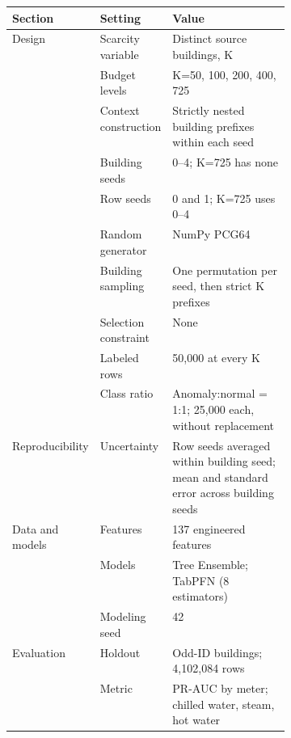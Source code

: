 \documentclass[10pt]{article}
\begin{document}
\begin{preview}\begin{minipage}{\linewidth}
\centering
{}
\label{tab:m5-exp-b-setup}
\begin{tabularx}{\linewidth}{p{0.17\linewidth}p{0.23\linewidth}X}
\toprule
Section & Setting & Value \\
\midrule
Design & Scarcity variable & Distinct source buildings, K \\
 & Budget levels & K=50, 100, 200, 400, 725 \\
 & Context construction & Strictly nested building prefixes within each seed \\
 & Building seeds & 0--4; K=725 has none \\
 & Row seeds & 0 and 1; K=725 uses 0--4 \\
 & Random generator & NumPy PCG64 \\
 & Building sampling & One permutation per seed, then strict K prefixes \\
 & Selection constraint & None \\
 & Labeled rows & 50{,}000 at every K \\
 & Class ratio & Anomaly:normal = 1:1; 25{,}000 each, without replacement \\
\addlinespace[2pt]
Reproducibility & Uncertainty & Row seeds averaged within building seed; mean and standard error across building seeds \\
\addlinespace[2pt]
Data and models & Features & 137 engineered features \\
 & Models & Tree Ensemble; TabPFN (8 estimators) \\
 & Modeling seed & 42 \\
\addlinespace[2pt]
Evaluation & Holdout & Odd-ID buildings; 4{,}102{,}084 rows \\
 & Metric & PR-AUC by meter; chilled water, steam, hot water \\
\bottomrule
\end{tabularx}
\end{minipage}\end{preview}
\end{document}
